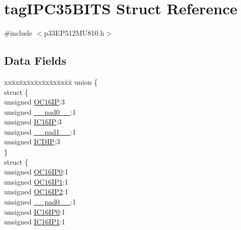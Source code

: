 \hypertarget{structtag_i_p_c35_b_i_t_s}{}\section{tag\+I\+P\+C35\+B\+I\+TS Struct Reference}
\label{structtag_i_p_c35_b_i_t_s}


{\ttfamily \#include $<$p33\+E\+P512\+M\+U810.\+h$>$}

\subsection*{Data Fields}
\begin{DoxyCompactItemize}
\item 
\begin{tabbing}
xx\=xx\=xx\=xx\=xx\=xx\=xx\=xx\=xx\=\kill
union \{\\
\>struct \{\\
\>\>unsigned \hyperlink{structtag_i_p_c35_b_i_t_s_a3204bd997f8846d5d3460985a9a340eb}{OC16IP}:3\\
\>\>unsigned \hyperlink{structtag_i_p_c35_b_i_t_s_adf71f3d8410c1f1dbbc96680a92c49af}{\_\_pad0\_\_}:1\\
\>\>unsigned \hyperlink{structtag_i_p_c35_b_i_t_s_afc0fda0d2cb8173d0d4238c74fe84b96}{IC16IP}:3\\
\>\>unsigned \hyperlink{structtag_i_p_c35_b_i_t_s_acaf2d0924a107ec6e8d2e31febaf66f9}{\_\_pad1\_\_}:1\\
\>\>unsigned \hyperlink{structtag_i_p_c35_b_i_t_s_ad9be19303e03475c88a26f2ff0cfcc7f}{ICDIP}:3\\
\>\} \\
\>struct \{\\
\>\>unsigned \hyperlink{structtag_i_p_c35_b_i_t_s_abf8517e33c36c160bba606a5e765b48f}{OC16IP0}:1\\
\>\>unsigned \hyperlink{structtag_i_p_c35_b_i_t_s_a1cb4a21e4f56ce3a39c187f80c95e819}{OC16IP1}:1\\
\>\>unsigned \hyperlink{structtag_i_p_c35_b_i_t_s_a95cad14fb3e48bafa25838b9cb8ef6af}{OC16IP2}:1\\
\>\>unsigned \hyperlink{structtag_i_p_c35_b_i_t_s_adf71f3d8410c1f1dbbc96680a92c49af}{\_\_pad0\_\_}:1\\
\>\>unsigned \hyperlink{structtag_i_p_c35_b_i_t_s_a86f0fd9ed842c3ff5c07877138b3647c}{IC16IP0}:1\\
\>\>unsigned \hyperlink{structtag_i_p_c35_b_i_t_s_a9c71434ca7a50ffb4dfe2eb8444aadfb}{IC16IP1}:1\\

\end{tabbing}
\end{DoxyCompactItemize}
